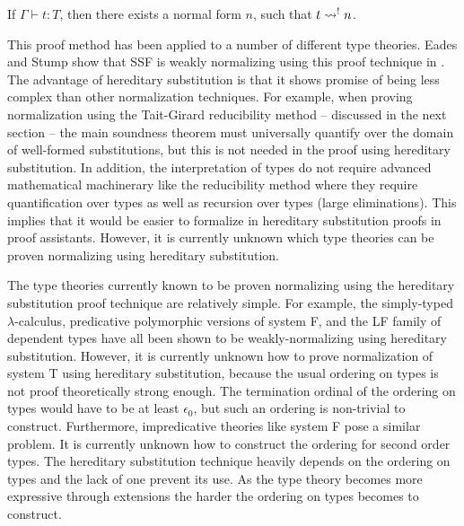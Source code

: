 \begin{corollary}
  If $\Gamma \vdash t:T$, then there exists a normal form $n$, such
  that $t \rightsquigarrow^{!} n$.
\end{corollary}

This proof method has been applied to a number of different type
theories.  Eades and Stump show that SSF is weakly normalizing using
this proof technique in \cite{Eades:2010}.  The advantage of
hereditary substitution is that it shows promise of being less complex
than other normalization techniques.  For example, when proving
normalization using the Tait-Girard reducibility method -- discussed
in the next section -- the main soundness theorem must universally
quantify over the domain of well-formed substitutions, but this is not
needed in the proof using hereditary substitution. In addition, the
interpretation of types do not require advanced mathematical
machinerary like the reducibility method where they require
quantification over types as well as recursion over types (large
eliminations).  This implies that it would be easier to formalize in
hereditary substitution proofs in proof assistants.  However, it is
currently unknown which type theories can be proven normalizing using
hereditary substitution.  

The type theories currently known to be proven normalizing using the
hereditary substitution proof technique are relatively simple.  For
example, the simply-typed $\lambda$-calculus, predicative polymorphic
versions of system F, and the LF family of dependent types have all
been shown to be weakly-normalizing using hereditary substitution.
However, it is currently unknown how to prove normalization of system
T using hereditary substitution, because the usual ordering on types
is not proof theoretically strong enough.  The termination ordinal of
the ordering on types would have to be at least $\epsilon_0$, but such
an ordering is non-trivial to construct.  Furthermore, impredicative
theories like system F pose a similar problem.  It is currently
unknown how to construct the ordering for second order types.  The
hereditary substitution technique heavily depends on the ordering on
types and the lack of one prevent its use.  As the type theory becomes
more expressive through extensions the harder the ordering on types
becomes to construct.

